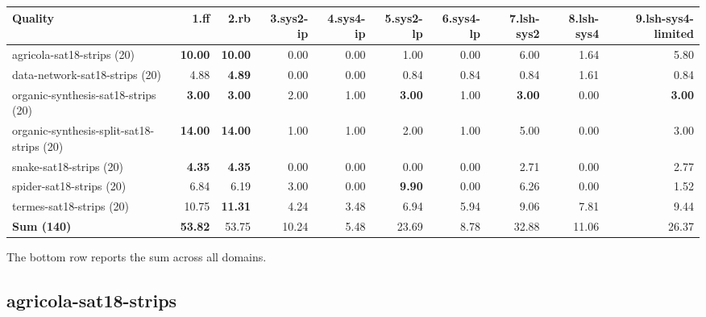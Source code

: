 \documentclass{article}
\newcommand{\numtasks}[1]{\small{(#1)}}
\begin{document}
\begin{tabular}{@{}lrrrrrrrrr@{}}
Quality & 1.ff & 2.rb & 3.sys2-ip & 4.sys4-ip & 5.sys2-lp & 6.sys4-lp & 7.lsh-sys2 & 8.lsh-sys4 & 9.lsh-sys4-limited \\
\midrule
agricola-sat18-strips \numtasks{20} & \textbf{10.00} & \textbf{10.00} & 0.00 & 0.00 & 1.00 & 0.00 & 6.00 & 1.64 & 5.80 \\
data-network-sat18-strips \numtasks{20} & 4.88 & \textbf{4.89} & 0.00 & 0.00 & 0.84 & 0.84 & 0.84 & 1.61 & 0.84 \\
organic-synthesis-sat18-strips \numtasks{20} & \textbf{3.00} & \textbf{3.00} & 2.00 & 1.00 & \textbf{3.00} & 1.00 & \textbf{3.00} & 0.00 & \textbf{3.00} \\
organic-synthesis-split-sat18-strips \numtasks{20} & \textbf{14.00} & \textbf{14.00} & 1.00 & 1.00 & 2.00 & 1.00 & 5.00 & 0.00 & 3.00 \\
snake-sat18-strips \numtasks{20} & \textbf{4.35} & \textbf{4.35} & 0.00 & 0.00 & 0.00 & 0.00 & 2.71 & 0.00 & 2.77 \\
spider-sat18-strips \numtasks{20} & 6.84 & 6.19 & 3.00 & 0.00 & \textbf{9.90} & 0.00 & 6.26 & 0.00 & 1.52 \\
termes-sat18-strips \numtasks{20} & 10.75 & \textbf{11.31} & 4.24 & 3.48 & 6.94 & 5.94 & 9.06 & 7.81 & 9.44 \\
\textbf{Sum \numtasks{140}} & \textbf{53.82} & 53.75 & 10.24 & 5.48 & 23.69 & 8.78 & 32.88 & 11.06 & 26.37 \\
\end{tabular}

The bottom row reports the sum across all domains.

\hypertarget{quality-agricola-sat18-strips}{}
\subsection*{agricola-sat18-strips}
\end{document}
